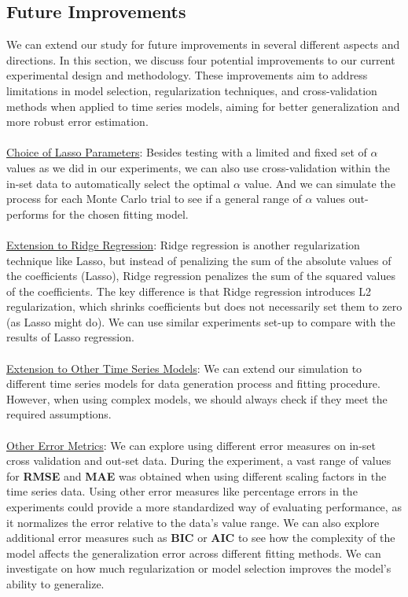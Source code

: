\documentclass[12pt, oneside]{amsart}
\theoremstyle{definition}
\theoremstyle{remark}
\numberwithin{equation}{section}
\begin{document}
\subsection{Future Improvements}
We can extend our study for future improvements in several different aspects and directions. In this section, we discuss four potential improvements to our current experimental design and methodology. These improvements aim to address limitations in model selection, regularization techniques, and cross-validation methods when applied to time series models, aiming for better generalization and more robust error estimation. 
\\
\\
\underline{Choice of Lasso Parameters}:
Besides testing with a limited and fixed set of $\alpha$ values as we did in our experiments, we can also use cross-validation within the in-set data to automatically select the optimal $\alpha$ value. And we can simulate the process for each Monte Carlo trial to see if a general range of $\alpha$ values out-performs for the chosen fitting model. 
\\
\\
\underline{Extension to Ridge Regression}: Ridge regression is another regularization technique like Lasso, but instead of penalizing the sum of the absolute values of the coefficients (Lasso), Ridge regression penalizes the sum of the squared values of the coefficients. The key difference is that Ridge regression introduces L2 regularization, which shrinks coefficients but does not necessarily set them to zero (as Lasso might do). We can use similar experiments set-up to compare with the results of Lasso regression.
\\
\\
\underline{Extension to Other Time Series Models}: We can extend our simulation to different time series models for data generation process and fitting procedure. However, when using complex models, we should always check if they meet the required assumptions. 
\\
\\
\underline{Other Error Metrics}:
We can explore using different error measures on in-set cross validation and out-set data. During the experiment, a vast range of values for \textbf{RMSE} and \textbf{MAE} was obtained when using different scaling factors in the time series data. Using other error measures like percentage errors in the experiments could provide a more standardized way of evaluating performance, as it normalizes the error relative to the data's value range. We can also explore additional error measures such as \textbf{BIC} or \textbf{AIC} to see how the complexity of the model affects the generalization error across different fitting methods. We can investigate on how much regularization or model selection improves the model’s ability to generalize.
\end{document}
